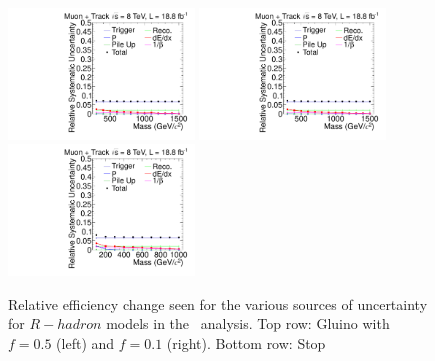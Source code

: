 \begin{figure}
\centering
  \includegraphics[clip=true, trim=0.0cm 0cm 2.8cm 0cm, width=0.44\textwidth]{figures/tkmu/MuGluino_f50Uncertainty}
  \includegraphics[clip=true, trim=0.0cm 0cm 2.8cm 0cm, width=0.44\textwidth]{figures/tkmu/MuGluino_f10Uncertainty}\\
  \includegraphics[clip=true, trim=0.0cm 0cm 2.8cm 0cm, width=0.44\textwidth]{figures/tkmu/MuStopUncertainty}
\caption{Relative efficiency change seen for the various sources of uncertainty for $R-hadron$ models in the \tktof\ analysis.
Top row: Gluino with $f=0.5$ (left) and $f=0.1$ (right).
Bottom row: Stop
    \label{fig:TkMuRHadUncSource}}
\end{figure}


